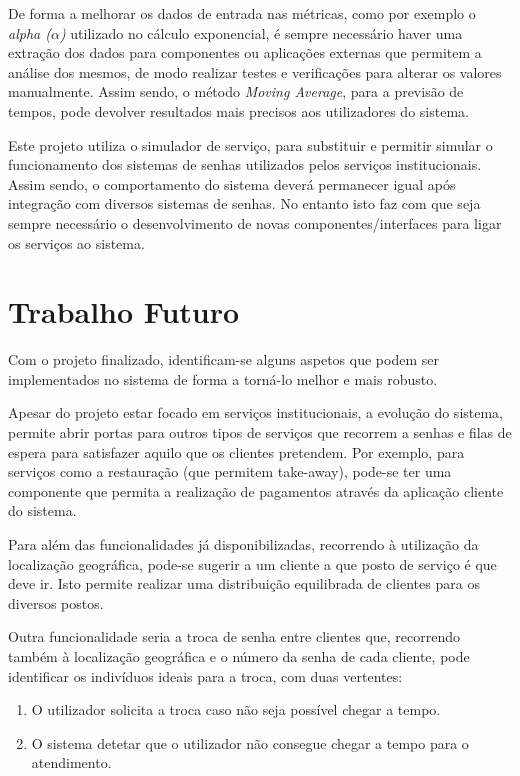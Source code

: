 De forma a melhorar os dados de entrada nas métricas, como por exemplo o \textit{alpha ($\alpha$)} utilizado no cálculo exponencial, é sempre necessário haver uma extração dos dados para componentes ou aplicações externas que permitem a análise dos mesmos, de modo realizar testes e verificações para alterar os valores manualmente. Assim sendo, o método \textit{Moving Average}, para a previsão de tempos, pode devolver resultados mais precisos aos utilizadores do sistema.

Este projeto utiliza o simulador de serviço, para substituir e permitir simular o funcionamento dos sistemas de senhas utilizados pelos serviços institucionais. Assim sendo, o comportamento do sistema deverá permanecer igual após integração com diversos sistemas de senhas. No entanto isto faz com que seja sempre necessário o desenvolvimento de novas componentes/interfaces para ligar os serviços ao sistema.

\section{Trabalho Futuro}

Com o projeto finalizado, identificam-se alguns aspetos que podem ser implementados no sistema de forma a torná-lo melhor e mais robusto.

Apesar do projeto estar focado em serviços institucionais, a evolução do sistema, permite abrir portas para outros tipos de serviços que recorrem a senhas e filas de espera para satisfazer aquilo que os clientes pretendem. Por exemplo, para serviços como a restauração (que permitem take-away), pode-se ter uma componente que permita a realização de pagamentos através da aplicação cliente do sistema.

Para além das funcionalidades já disponibilizadas, recorrendo à utilização da localização geográfica, pode-se sugerir a um cliente a que posto de serviço é que deve ir. Isto permite realizar uma distribuição equilibrada de clientes para os diversos postos. 

Outra funcionalidade seria a troca de senha entre clientes que, recorrendo também à localização geográfica e o número da senha de cada cliente, pode identificar os indivíduos ideais para a troca, com duas vertentes:
\begin{enumerate}
\item O utilizador solicita a troca caso não seja possível chegar a tempo.
\item O sistema detetar que o utilizador não consegue chegar a tempo para o atendimento.
\end{enumerate}

